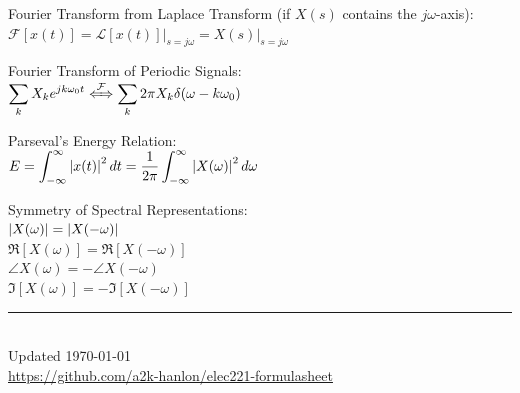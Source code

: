 \documentclass[12pt,landscape,letterpaper]{article}
\newcommand{\tab}{\hspace{0.02\textwidth}}
\newcommand{\ds}{\displaystyle}
\begin{document}
\begin{multicols*}{3}
Fourier Transform from Laplace Transform (if $X(s)$ contains the $j\omega$-axis):\\
\tab $\mathcal{F}[x(t)] = \mathcal{L}[x(t)]\big\rvert_{s = j\omega} = X(s)\big\rvert_{s = j\omega}$

Fourier Transform of Periodic Signals:\\
\tab $\ds \sum_k X_k e^{jk\omega_0 t} \xLeftrightarrow{\mathcal{F}} \sum_k 2\pi X_k \delta(\omega - k\omega_0)$

Parseval's Energy Relation:\\
\tab $\ds E = \int_{-\infty}^{\infty} \abs{x(t)}^2\,dt = \frac{1}{2\pi}\int_{-\infty}^{\infty}\abs{X(\omega)}^2\,d\omega$

Symmetry of Spectral Representations:\\
\tab $\abs{X(\omega)} = \abs{X(-\omega)}$\\
\tab $\Re[X(\omega)] = \Re[X(-\omega)]$\\
\tab $\angle X(\omega) = -\angle X(-\omega)$\\
\tab $\Im[X(\omega)] = -\Im[X(-\omega)]$

\rule{0.3\linewidth}{0.25pt}
\scriptsize\\
Updated \today\\
\href{https://github.com/a2k-hanlon/elec221-formulasheet}{https://github.com/a2k-hanlon/elec221-formulasheet}
\end{multicols*}
\end{document}
